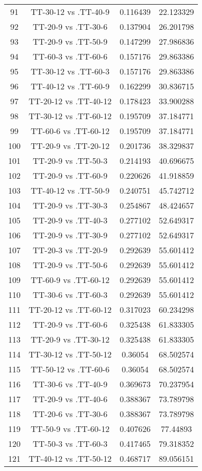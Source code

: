 \documentclass[a4paper,10pt]{article}
\begin{document}
\begin{landscape}
\begin{table}[!htp]
\begin{tabular}{cccc}
91&TT-30-12 vs .TT-40-9&0.116439&22.123329\\
92&TT-20-9 vs .TT-30-6&0.137904&26.201798\\
93&TT-20-9 vs .TT-50-9&0.147299&27.986836\\
94&TT-60-3 vs .TT-60-6&0.157176&29.863386\\
95&TT-30-12 vs .TT-60-3&0.157176&29.863386\\
96&TT-40-12 vs .TT-60-9&0.162299&30.836715\\
97&TT-20-12 vs .TT-40-12&0.178423&33.900288\\
98&TT-30-12 vs .TT-60-12&0.195709&37.184771\\
99&TT-60-6 vs .TT-60-12&0.195709&37.184771\\
100&TT-20-9 vs .TT-20-12&0.201736&38.329837\\
101&TT-20-9 vs .TT-50-3&0.214193&40.696675\\
102&TT-20-9 vs .TT-60-9&0.220626&41.918859\\
103&TT-40-12 vs .TT-50-9&0.240751&45.742712\\
104&TT-20-9 vs .TT-30-3&0.254867&48.424657\\
105&TT-20-9 vs .TT-40-3&0.277102&52.649317\\
106&TT-20-9 vs .TT-30-9&0.277102&52.649317\\
107&TT-20-3 vs .TT-20-9&0.292639&55.601412\\
108&TT-20-9 vs .TT-50-6&0.292639&55.601412\\
109&TT-60-9 vs .TT-60-12&0.292639&55.601412\\
110&TT-30-6 vs .TT-60-3&0.292639&55.601412\\
111&TT-20-12 vs .TT-60-12&0.317023&60.234298\\
112&TT-20-9 vs .TT-60-6&0.325438&61.833305\\
113&TT-20-9 vs .TT-30-12&0.325438&61.833305\\
114&TT-30-12 vs .TT-50-12&0.36054&68.502574\\
115&TT-50-12 vs .TT-60-6&0.36054&68.502574\\
116&TT-30-6 vs .TT-40-9&0.369673&70.237954\\
117&TT-20-9 vs .TT-40-6&0.388367&73.789798\\
118&TT-20-6 vs .TT-30-6&0.388367&73.789798\\
119&TT-50-9 vs .TT-60-12&0.407626&77.44893\\
120&TT-50-3 vs .TT-60-3&0.417465&79.318352\\
121&TT-40-12 vs .TT-50-12&0.468717&89.056151\\

\end{tabular}
\end{table}
\end{landscape}
\end{document}
